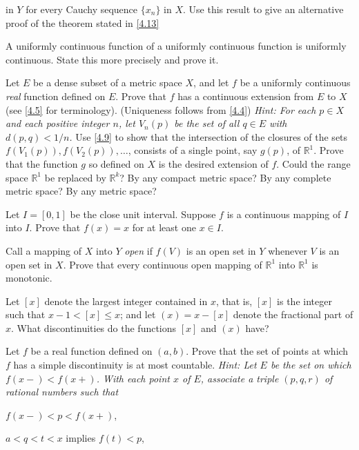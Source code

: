 \begin{exercise}
  in \(Y\) for every Cauchy sequence \(\{x_n\}\) in \(X\).
  Use this result to give an alternative proof of the theorem stated in
  \cref{4.13}
\item
  A uniformly continuous function of a uniformly continuous function is
  uniformly continuous.
  State this more precisely and prove it.
\item
  \label{4.13}
  Let \(E\) be a dense subset of a metric space \(X\), and let \(f\) be a
  uniformly continuous \textit{real} function defined on \(E\).
  Prove that \(f\) has a continuous extension from \(E\) to \(X\)
  (see \cref{4.5} for terminology).
  (Uniqueness follows from \cref{4.4})
  \textit{Hint: For each \(p\in X\) and each positive integer \(n\), let
    \(V_n(p)\) be the set of all \(q\in E\) with \(d(p,q) < 1/n\).}
  Use \cref{4.9} to show that the intersection of the closures of the sets
  \(f(V_1(p)),f(V_2(p)),\ldots\), consists of a single point, say \(g(p)\), of
  \(\mathbb{R}^1\).
  Prove that the function \(g\) so defined on \(X\) is the desired extension
  of \(f\).
  Could the range space \(\mathbb{R}^1\) be replaced by \(\mathbb{R}^k\)?
  By any compact metric space?
  By any complete metric space?
  By any metric space?
\item
  Let \(I = [0,1]\) be the close unit interval.
  Suppose \(f\) is a continuous mapping of \(I\) into \(I\).
  Prove that \(f(x) = x\) for at least one \(x\in I\).
\item
  Call a mapping of \(X\) into \(Y\) \textit{open} if \(f(V)\) is an open set
  in \(Y\) whenever \(V\) is an open set in \(X\).
  Prove that every continuous open mapping of \(\mathbb{R}^1\) into
  \(\mathbb{R}^1\) is monotonic.
\item
  Let \([x]\) denote the largest integer contained in \(x\), that is, \([x]\)
  is the integer such that \(x - 1 < [x]\leq x\); and let \((x) = x - [x]\)
  denote the fractional part of \(x\).
  What discontinuities do the functions \([x]\) and \((x)\) have?
\item
  Let \(f\) be a real function defined on \((a,b)\).
  Prove that the set of points at which \(f\) has a simple discontinuity is at
  most countable.
  \textit{Hint: Let \(E\) be the set on which \(f(x-) < f(x+)\).
    With each point \(x\) of \(E\), associate a triple \((p,q,r)\) of rational
    numbers such that}
  \begin{exercise}[label = (\alph*)]
  \item
    \(f(x-) < p < f(x+)\),
  \item
    \(a < q < t < x\) implies \(f(t) < p\),

\end{exercise}
\end{exercise}
